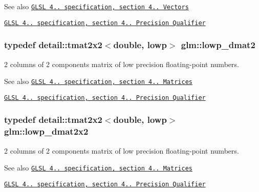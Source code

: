 \begin{DoxySeeAlso}{See also}
\href{http://www.opengl.org/registry/doc/GLSLangSpec.4.20.8.pdf}{\tt G\+L\+SL 4.. specification, section 4.. Vectors} 

\href{http://www.opengl.org/registry/doc/GLSLangSpec.4.20.8.pdf}{\tt G\+L\+SL 4.. specification, section 4.. Precision Qualifier} 
\end{DoxySeeAlso}
\subsubsection[{\texorpdfstring{lowp\+\_\+dmat2}{lowp_dmat2}}]{\setlength{\rightskip}{0pt plus 5cm}typedef detail\+::tmat2x2$<$double, lowp$>$ {\bf glm\+::lowp\+\_\+dmat2}}\hypertarget{group__core__precision_ga5e08c45dfef867e0326a1eee95060cd0}{}\label{group__core__precision_ga5e08c45dfef867e0326a1eee95060cd0}
2 columns of 2 components matrix of low precision floating-\/point numbers.

\begin{DoxySeeAlso}{See also}
\href{http://www.opengl.org/registry/doc/GLSLangSpec.4.20.8.pdf}{\tt G\+L\+SL 4.. specification, section 4.. Matrices} 

\href{http://www.opengl.org/registry/doc/GLSLangSpec.4.20.8.pdf}{\tt G\+L\+SL 4.. specification, section 4.. Precision Qualifier} 
\end{DoxySeeAlso}
\subsubsection[{\texorpdfstring{lowp\+\_\+dmat2x2}{lowp_dmat2x2}}]{\setlength{\rightskip}{0pt plus 5cm}typedef detail\+::tmat2x2$<$double, lowp$>$ {\bf glm\+::lowp\+\_\+dmat2x2}}\hypertarget{group__core__precision_ga68b486ff22814c1a3781378513a9fcc0}{}\label{group__core__precision_ga68b486ff22814c1a3781378513a9fcc0}
2 columns of 2 components matrix of low precision floating-\/point numbers.

\begin{DoxySeeAlso}{See also}
\href{http://www.opengl.org/registry/doc/GLSLangSpec.4.20.8.pdf}{\tt G\+L\+SL 4.. specification, section 4.. Matrices} 

\href{http://www.opengl.org/registry/doc/GLSLangSpec.4.20.8.pdf}{\tt G\+L\+SL 4.. specification, section 4.. Precision Qualifier} 
\end{DoxySeeAlso}
